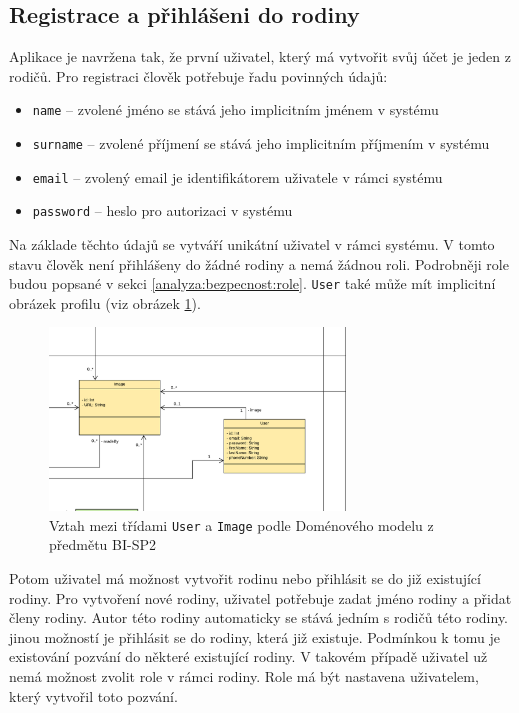     \subsection{Registrace a přihlášeni do rodiny}
        Aplikace je navržena tak, že první uživatel, který má vytvořit svůj účet je jeden z rodičů. Pro registraci člověk potřebuje řadu povinných údajů:
        \begin{itemize}
	        \item \texttt{name} -- zvolené jméno se stává jeho implicitním jménem v systému
	        \item \texttt{surname} -- zvolené příjmení se stává jeho implicitním příjmením v systému
	        \item \texttt{email} -- zvolený email je identifikátorem uživatele v rámci systému
	        \item \texttt{password} -- heslo pro autorizaci v systému
        \end{itemize}
        Na základe těchto údajů se vytváří unikátní uživatel v rámci systému. V tomto stavu člověk není přihlášeny do žádné rodiny a nemá žádnou roli. Podrobněji role budou popsané v sekci \ref{analyza:bezpecnost:role}. \texttt{User} také může mít implicitní obrázek profilu (viz obrázek \ref{image:User-Image1}).
        \begin{figure}\centering
	        \includegraphics[width=0.7\textwidth]{pdfs/User-Image1}
	        \caption[Návrh User-Image]{Vztah mezi třídami \texttt{User} a \texttt{Image} podle Doménového modelu z předmětu BI-SP2}\label{image:User-Image1}
        \end{figure}
        
        Potom uživatel má možnost vytvořit rodinu nebo přihlásit se do již existující rodiny. Pro vytvoření nové rodiny, uživatel potřebuje zadat jméno rodiny a přidat členy rodiny. Autor této rodiny automaticky se stává jedním s rodičů této rodiny. jinou možností je přihlásit se do rodiny, která již existuje. Podmínkou k tomu je existování pozvání do některé existující rodiny. V takovém případě uživatel už nemá možnost zvolit role v rámci rodiny. Role má být nastavena uživatelem, který vytvořil toto pozvání.

